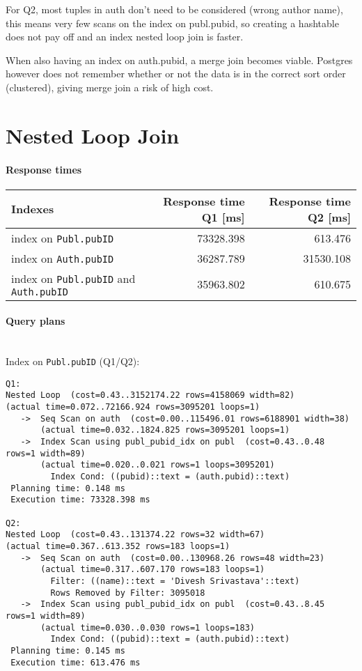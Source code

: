 \documentclass[11pt]{scrartcl}
\begin{document}
For Q2, most tuples in auth don't need to be considered (wrong author name), this means very few
scans on the index on publ.pubid, so creating a hashtable does not pay off and an index nested loop
join is faster.

When also having an index on auth.pubid, a merge join becomes viable. Postgres however does not
remember whether or not the data is in the correct sort order (clustered), giving merge join a risk
of high cost.
\section{Nested Loop Join}

\paragraph{Response times}

\begin{flushleft}
\begin{tabular}{l|r|r}
  Indexes & Response time Q1 [ms] & Response time Q2 [ms] \\
  \hline
  index on {\tt Publ.pubID} & 73328.398 & 613.476  \\
  index on {\tt Auth.pubID} & 36287.789 & 31530.108 \\
  index on {\tt Publ.pubID} and {\tt Auth.pubID} & 35963.802 & 610.675 \\
\end{tabular}
\end{flushleft}

\paragraph{Query plans}\mbox{}\\ 

\noindent Index on {\tt Publ.pubID} (Q1/Q2):
{\small
\begin{verbatim}
Q1:
Nested Loop  (cost=0.43..3152174.22 rows=4158069 width=82)
(actual time=0.072..72166.924 rows=3095201 loops=1)
   ->  Seq Scan on auth  (cost=0.00..115496.01 rows=6188901 width=38)
       (actual time=0.032..1824.825 rows=3095201 loops=1)
   ->  Index Scan using publ_pubid_idx on publ  (cost=0.43..0.48 rows=1 width=89)
       (actual time=0.020..0.021 rows=1 loops=3095201)
         Index Cond: ((pubid)::text = (auth.pubid)::text)
 Planning time: 0.148 ms
 Execution time: 73328.398 ms

Q2:
Nested Loop  (cost=0.43..131374.22 rows=32 width=67)
(actual time=0.367..613.352 rows=183 loops=1)
   ->  Seq Scan on auth  (cost=0.00..130968.26 rows=48 width=23)
       (actual time=0.317..607.170 rows=183 loops=1)
         Filter: ((name)::text = 'Divesh Srivastava'::text)
         Rows Removed by Filter: 3095018
   ->  Index Scan using publ_pubid_idx on publ  (cost=0.43..8.45 rows=1 width=89)
       (actual time=0.030..0.030 rows=1 loops=183)
         Index Cond: ((pubid)::text = (auth.pubid)::text)
 Planning time: 0.145 ms
 Execution time: 613.476 ms
\end{verbatim}
}
\end{document}
